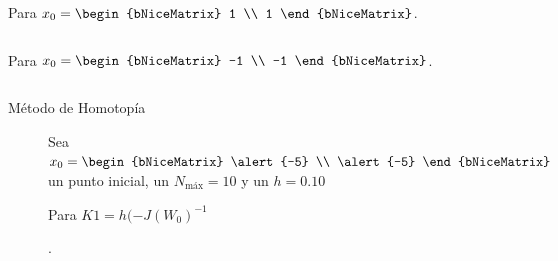 \begin{frame}[fragile]
	Para
	\begin{math}
		x_{0}=
		\begin{bNiceMatrix}
			1 \\
			1
		\end{bNiceMatrix}
	\end{math}.
	\begin{center}
		\begin{minipage}{0.5\textwidth}
			\inputminted[fontsize=\tiny,firstline=1,lastline=17]{text}{resultado_pregunta_2.txt}
		\end{minipage}
	\end{center}

	Para
	\begin{math}
		x_{0}=
		\begin{bNiceMatrix}
			-1 \\
			-1
		\end{bNiceMatrix}
	\end{math}.
	\begin{center}
		\begin{minipage}{0.5\textwidth}
			\inputminted[fontsize=\tiny,firstline=18,lastline=35]{text}{resultado_pregunta_2.txt}
		\end{minipage}
	\end{center}
\end{frame}

\begin{frame}
	\begin{solution}
		\begin{description}
			\item[Método de Homotopía]
                    Sea
				\begin{math}
					x_{0}=
					\begin{bNiceMatrix}
						\alert{-5} \\
						\alert{-5}
					\end{bNiceMatrix}
				\end{math}
				un punto inicial, un
				$N_{\text{máx}}=10$ y un $h=0.10$

                Para $K1=h(-J(W_0)^{-1}$

				.
 		\end{description}
	\end{solution}
 \end{frame}